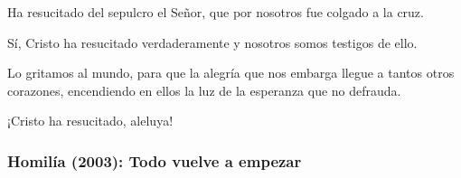 \begin{body}

Ha resucitado del sepulcro el Señor, que por nosotros fue colgado a la cruz.

Sí, Cristo ha resucitado verdaderamente y nosotros somos testigos de ello.

Lo gritamos al mundo, para que la alegría que nos embarga llegue a tantos otros corazones, encendiendo en ellos la luz de la esperanza que no defrauda.

¡Cristo ha resucitado, aleluya!
\end{body}

\newpage 

\subsubsection{Homilía (2003): Todo vuelve a empezar}


